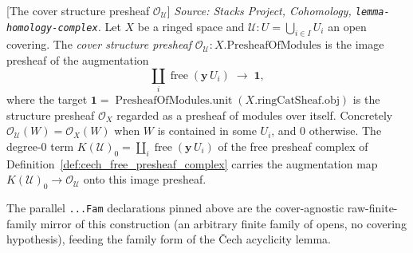 \begin{definition}

[The cover structure presheaf \(\mathcal{O}_{\mathcal{U}}\)]
  \label{def:cover_structure_presheaf}
  \textit{Source: Stacks Project, Cohomology, \texttt{lemma-homology-complex}.}
  Let \(X\) be a ringed space and \(\mathcal{U} : U = \bigcup_{i \in I} U_i\) an open
  covering. The \emph{cover structure presheaf} \(\mathcal{O}_{\mathcal{U}} :
  X.\mathrm{PresheafOfModules}\) is the image presheaf of the augmentation
  \[
    \coprod_i \operatorname{free}(\mathbf{y}\,U_i) \;\longrightarrow\; \mathbf{1},
  \]
  where the target \(\mathbf{1} = \operatorname{PresheafOfModules.unit}(
  X.\mathrm{ringCatSheaf}.\mathrm{obj})\) is the structure presheaf \(\mathcal{O}_X\)
  regarded as a presheaf of modules over itself. Concretely
  \(\mathcal{O}_{\mathcal{U}}(W) = \mathcal{O}_X(W)\) when \(W\) is contained in some
  \(U_i\), and \(0\) otherwise. The degree-\(0\) term
  \(K(\mathcal{U})_0 = \coprod_i \operatorname{free}(\mathbf{y}\,U_i)\) of the free
  presheaf complex of Definition~\ref{def:cech_free_presheaf_complex} carries the
  augmentation map \(K(\mathcal{U})_0 \to \mathcal{O}_{\mathcal{U}}\) onto this image
  presheaf.

  The parallel \texttt{...Fam} declarations pinned above are the cover-agnostic
  raw-finite-family mirror of this construction (an arbitrary finite family of opens,
  no covering hypothesis), feeding the family form of the {\v C}ech acyclicity lemma.
\end{definition}

